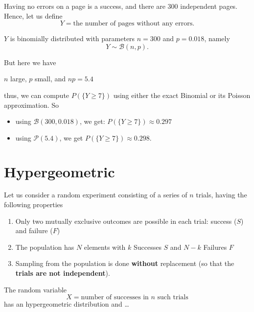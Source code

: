 \documentclass[smaller]{beamer}\usepackage[]{graphicx}\usepackage[]{color}
\newenvironment{stepenumerate}{\begin{enumerate}[<+->]}{\end{enumerate}}
\begin{document}
\begin{frame}{\secname}%

  \begin{example}[cont'd]
  \begin{footnotesize}
  Having no errors on a page is a success, and there are 300 independent pages. Hence, let us define
  $$
  Y = \text{the number of pages without any errors}.
  $$

  $Y$ is binomially distributed with parameters $n = 300$
  and $p = 0.018$, namely
  $$Y\sim \mathcal{B}(n,p).$$


  But here we have
  \begin{center}
  $n$ large, $p$ small, and $n p = 5.4$
  \end{center}
  thus, we can compute $P(\{Y \geq 7\})$  using either the exact Binomial or its Poisson approximation. So
  \begin{itemize}
  \item using $\mathcal{B}(300,0.018)$, we get: $P(\{Y \geq 7\}) \approx  0.297$ \\ \vspace{0.1cm}

  \item using $\mathcal{P}(5.4)$, we get $P(\{Y \geq 7\})  \approx  0.298.$
  \end{itemize}
  \end{footnotesize}
  \end{example}
\end{frame}%

\section{Hypergeometric}

\begin{frame}{\secname}

  \begin{definition}
  Let us consider a random experiment consisting of a series of $n$ trials,
  having the following properties

  \begin{stepenumerate}
  \item Only two mutually exclusive outcomes are possible in each trial:
  success ($S$) and failure ($F$)

  \item The population has $N$ elements with $k$ Successes $S$ and $N-k$ Failures $F$

  \item Sampling from the population is done \textbf{without} replacement (so
  that the \textbf{trials are not independent}).
  \end{stepenumerate}

  The random variable
  $$
  X= \text{number of successes in $n$ such trials}
  $$
  has an hypergeometric distribution and \dots
  \end{definition}
\end{frame}
\end{document}

